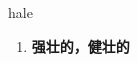 
\begin{frame}
{\huge hale}
\begin{center}
\begin{enumerate}\Large
  \item \textbf{强壮的，健壮的}
\end{enumerate}
\end{center}
\end{frame}
